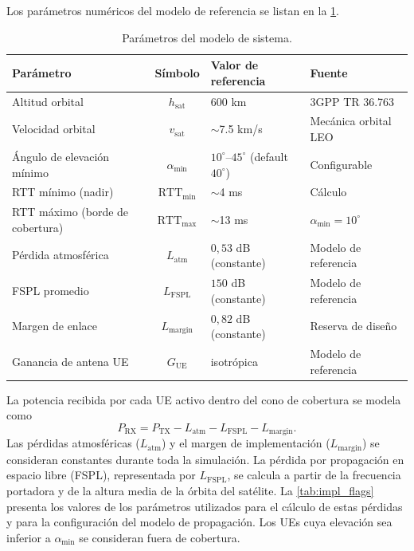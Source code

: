 Los parámetros numéricos del modelo de referencia se listan en la \cref{tab:parametros}.
\begin{table}[H]
\centering
\caption{Parámetros del modelo de sistema.}
\label{tab:parametros}
\small
\begin{tabular}{@{}l c l l@{}}
\toprule
\textbf{Parámetro} & \textbf{Símbolo} & \textbf{Valor de referencia} & \textbf{Fuente} \\
\midrule
Altitud orbital & $h_{\text{sat}}$ & 600 km & 3GPP TR 36.763 \\
Velocidad orbital & $v_{\text{sat}}$ & $\sim$7.5 km/s & Mecánica orbital LEO \\
Ángulo de elevación mínimo & $\alpha_{\min}$ & $10^\circ$--$45^\circ$ (default $40^\circ$) & Configurable \\
RTT mínimo (nadir) & $\mathrm{RTT}_{\min}$ & $\sim$4 ms & Cálculo \\
RTT máximo (borde de cobertura) & $\mathrm{RTT}_{\max}$ & $\sim$13 ms & $\alpha_{\min}=10^\circ$ \\
Pérdida atmosférica & $L_{\text{atm}}$ & $0{,}53$ dB (constante) & Modelo de referencia \\
FSPL promedio & $L_{\text{FSPL}}$ & $150$ dB (constante) & Modelo de referencia \\
Margen de enlace & $L_{\text{margin}}$ & $0{,}82$ dB (constante) & Reserva de diseño \\
Ganancia de antena UE & $G_{\text{UE}}$ & isotrópica & Modelo de referencia \\
\bottomrule
\end{tabular}
\end{table}

La potencia recibida por cada UE activo dentro del cono de cobertura se modela como
\begin{equation}
  P_{\text{RX}} = P_{\text{TX}} - L_{\text{atm}} - L_{\text{FSPL}} - L_{\text{margin}}.
  \label{eq:link_budget}
\end{equation}
Las pérdidas atmosféricas ($L_{\mathrm{atm}}$) y el margen de implementación ($L_{\mathrm{margin}}$) se consideran constantes durante toda la simulación. La pérdida por propagación en espacio libre (FSPL), representada por $L_{\mathrm{FSPL}}$, se calcula a partir de la frecuencia portadora y de la altura media de la órbita del satélite. La \cref{tab:impl_flags} presenta los valores de los parámetros utilizados para el cálculo de estas pérdidas y para la configuración del modelo de propagación. Los UEs cuya elevación sea inferior a $\alpha_{\min}$ se consideran fuera de cobertura.

